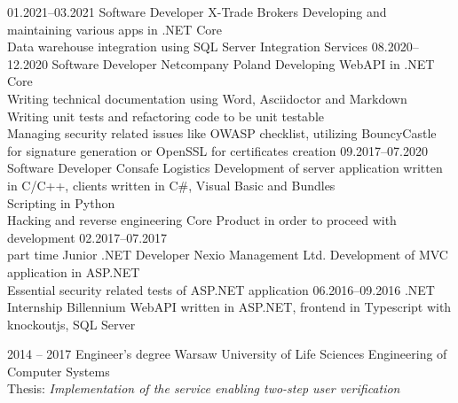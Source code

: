 \documentclass[9pt]{developercv} %
\begin{document}
\begin{entrylist}
	\entry
		{01.2021--03.2021}
		{Software Developer}
		{X-Trade Brokers}
		{
		  Developing and maintaining various apps in .NET Core\\
		  Data warehouse integration using SQL Server Integration Services
		}
	\entry
		{08.2020--12.2020}
		{Software Developer}
		{Netcompany Poland}
		{
		  Developing WebAPI in .NET Core\\
		  Writing technical documentation using Word, Asciidoctor and Markdown\\
		  Writing unit tests and refactoring code to be unit testable\\
		  Managing security related issues like OWASP checklist, utilizing BouncyCastle for signature generation or OpenSSL for certificates creation
		}
	\entry
		{09.2017--07.2020}
		{Software Developer}
		{Consafe Logistics}
		{
		  Development of server application written in C/C++, clients written in C\#, Visual Basic and Bundles\\
		  Scripting in Python\\
		  Hacking and reverse engineering Core Product in order to proceed with development
		}
	\entry
		{02.2017--07.2017\\\footnotesize{part time}}
		{Junior .NET Developer}
		{Nexio Management Ltd.}
		{
		  Development of MVC application in ASP.NET\\
		  Essential security related tests of ASP.NET application
		}
	\entry
		{06.2016--09.2016}
		{.NET Internship}
		{Billennium}
		{
		  WebAPI written in ASP.NET, frontend in Typescript with knockoutjs, SQL Server
		}

\end{entrylist}



\begin{entrylist}
	\entry
		{2014 -- 2017}
		{Engineer’s degree}
		{Warsaw University of Life Sciences}
		{
			Engineering of Computer Systems\\
			Thesis: \it{Implementation of the service enabling two-step user verification}
		}
\end{entrylist}

\end{document}
